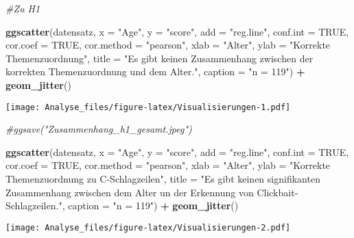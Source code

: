 \documentclass[]{article}
\newenvironment{Shaded}{\begin{snugshade}}{\end{snugshade}}
\newcommand{\KeywordTok}[1]{\textcolor[rgb]{0.13,0.29,0.53}{\textbf{#1}}}
\newcommand{\DataTypeTok}[1]{\textcolor[rgb]{0.13,0.29,0.53}{#1}}
\newcommand{\StringTok}[1]{\textcolor[rgb]{0.31,0.60,0.02}{#1}}
\newcommand{\CommentTok}[1]{\textcolor[rgb]{0.56,0.35,0.01}{\textit{#1}}}
\newcommand{\OtherTok}[1]{\textcolor[rgb]{0.56,0.35,0.01}{#1}}
\newcommand{\OperatorTok}[1]{\textcolor[rgb]{0.81,0.36,0.00}{\textbf{#1}}}
\newcommand{\NormalTok}[1]{#1}
\begin{document}
\begin{Shaded}
\begin{Highlighting}[]
\CommentTok{#Zu H1}

\KeywordTok{ggscatter}\NormalTok{(datensatz, }\DataTypeTok{x =} \StringTok{"Age"}\NormalTok{, }\DataTypeTok{y =} \StringTok{"score"}\NormalTok{, }
          \DataTypeTok{add =} \StringTok{"reg.line"}\NormalTok{, }\DataTypeTok{conf.int =} \OtherTok{TRUE}\NormalTok{, }
          \DataTypeTok{cor.coef =} \OtherTok{TRUE}\NormalTok{, }\DataTypeTok{cor.method =} \StringTok{"pearson"}\NormalTok{,}
          \DataTypeTok{xlab =} \StringTok{"Alter"}\NormalTok{, }\DataTypeTok{ylab =} \StringTok{"Korrekte Themenzuordnung"}\NormalTok{, }\DataTypeTok{title =} \StringTok{"Es gibt keinen Zusammenhang zwischen der korrekten Themenzuordnung und }
\StringTok{dem Alter."}\NormalTok{, }\DataTypeTok{caption =} \StringTok{"n = 119"}\NormalTok{) }\OperatorTok{+}
\StringTok{  }\KeywordTok{geom_jitter}\NormalTok{()}
\end{Highlighting}
\end{Shaded}

\texttt{[image: Analyse\_files/figure-latex/Visualisierungen-1.pdf]}

\begin{Shaded}
\begin{Highlighting}[]
\CommentTok{#ggsave("Zusammenhang_h1_gesamt.jpeg")}

\KeywordTok{ggscatter}\NormalTok{(datensatz, }\DataTypeTok{x =} \StringTok{"Age"}\NormalTok{, }\DataTypeTok{y =} \StringTok{"score"}\NormalTok{, }
          \DataTypeTok{add =} \StringTok{"reg.line"}\NormalTok{, }\DataTypeTok{conf.int =} \OtherTok{TRUE}\NormalTok{, }
          \DataTypeTok{cor.coef =} \OtherTok{TRUE}\NormalTok{, }\DataTypeTok{cor.method =} \StringTok{"pearson"}\NormalTok{,}
          \DataTypeTok{xlab =} \StringTok{"Alter"}\NormalTok{, }\DataTypeTok{ylab =} \StringTok{"Korrekte Themenzuordnung zu C-Schlagzeilen"}\NormalTok{, }\DataTypeTok{title =} \StringTok{"Es gibt keinen signifikanten Zusammenhang zwischen dem Alter un der Erkennung von Clickbait-Schlagzeilen."}\NormalTok{, }\DataTypeTok{caption =} \StringTok{"n = 119"}\NormalTok{) }\OperatorTok{+}
\StringTok{  }\KeywordTok{geom_jitter}\NormalTok{()}
\end{Highlighting}
\end{Shaded}

\texttt{[image: Analyse\_files/figure-latex/Visualisierungen-2.pdf]}
\end{document}
